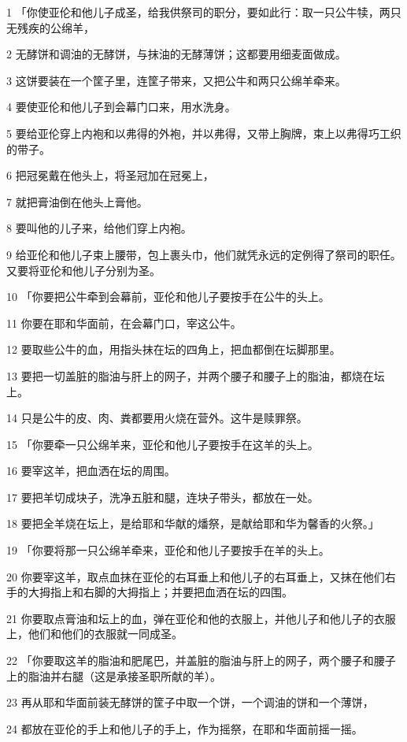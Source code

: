 \par 1 「你使亚伦和他儿子成圣，给我供祭司的职分，要如此行：取一只公牛犊，两只无残疾的公绵羊，
\par 2 无酵饼和调油的无酵饼，与抹油的无酵薄饼；这都要用细麦面做成。
\par 3 这饼要装在一个筐子里，连筐子带来，又把公牛和两只公绵羊牵来。
\par 4 要使亚伦和他儿子到会幕门口来，用水洗身。
\par 5 要给亚伦穿上内袍和以弗得的外袍，并以弗得，又带上胸牌，束上以弗得巧工织的带子。
\par 6 把冠冕戴在他头上，将圣冠加在冠冕上，
\par 7 就把膏油倒在他头上膏他。
\par 8 要叫他的儿子来，给他们穿上内袍。
\par 9 给亚伦和他儿子束上腰带，包上裹头巾，他们就凭永远的定例得了祭司的职任。又要将亚伦和他儿子分别为圣。
\par 10 「你要把公牛牵到会幕前，亚伦和他儿子要按手在公牛的头上。
\par 11 你要在耶和华面前，在会幕门口，宰这公牛。
\par 12 要取些公牛的血，用指头抹在坛的四角上，把血都倒在坛脚那里。
\par 13 要把一切盖脏的脂油与肝上的网子，并两个腰子和腰子上的脂油，都烧在坛上。
\par 14 只是公牛的皮、肉、粪都要用火烧在营外。这牛是赎罪祭。
\par 15 「你要牵一只公绵羊来，亚伦和他儿子要按手在这羊的头上。
\par 16 要宰这羊，把血洒在坛的周围。
\par 17 要把羊切成块子，洗净五脏和腿，连块子带头，都放在一处。
\par 18 要把全羊烧在坛上，是给耶和华献的燔祭，是献给耶和华为馨香的火祭。」
\par 19 「你要将那一只公绵羊牵来，亚伦和他儿子要按手在羊的头上。
\par 20 你要宰这羊，取点血抹在亚伦的右耳垂上和他儿子的右耳垂上，又抹在他们右手的大拇指上和右脚的大拇指上；并要把血洒在坛的四围。
\par 21 你要取点膏油和坛上的血，弹在亚伦和他的衣服上，并他儿子和他儿子的衣服上，他们和他们的衣服就一同成圣。
\par 22 「你要取这羊的脂油和肥尾巴，并盖脏的脂油与肝上的网子，两个腰子和腰子上的脂油并右腿（这是承接圣职所献的羊）。
\par 23 再从耶和华面前装无酵饼的筐子中取一个饼，一个调油的饼和一个薄饼，
\par 24 都放在亚伦的手上和他儿子的手上，作为摇祭，在耶和华面前摇一摇。
